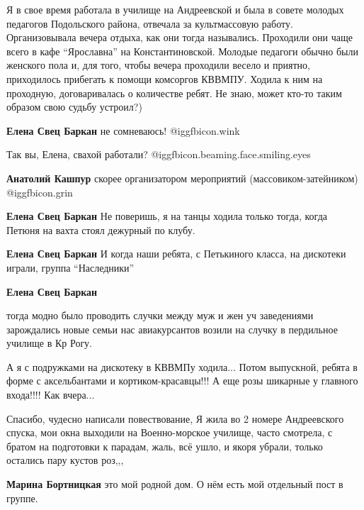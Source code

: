 \begin{itemize}
Я в свое время работала в училище на Андреевской и была в совете молодых
педагогов Подольского района, отвечала за культмассовую работу. Организовывала
вечера отдыха, как они тогда назывались. Проходили они чаще всего в кафе
\enquote{Ярославна} на Константиновской. Молодые педагоги обычно были женского пола и,
для того, чтобы вечера проходили весело и приятно, приходилось прибегать к
помощи комсоргов КВВМПУ. Ходила к ним на проходную, договаривалась о количестве
ребят. Не знаю, может кто-то таким образом свою судьбу устроил?)

\begin{itemize} %
\textbf{Елена Свец Баркан} не сомневаюсь! @igg{fbicon.wink} 

Так вы, Елена, свахой работали?  @igg{fbicon.beaming.face.smiling.eyes} 

\textbf{Анатолий Кашпур} скорее организатором мероприятий (массовиком-затейником) @igg{fbicon.grin} 

\textbf{Елена Свец Баркан} Не поверишь, я на танцы ходила только тогда, когда Петюня на вахта стоял дежурный по клубу.

\textbf{Елена Свец Баркан} И когда наши ребята, с Петькиного класса, на дискотеки играли, группа \enquote{Наследники}

\textbf{Елена Свец Баркан} 

тогда модно было проводить случки между муж и жен уч заведениями зарождались
новые семьи нас авиакурсантов возили на случку в пердильное училище в Кр Рогу.

\end{itemize} %


А я с подружками на дискотеку в КВВМПу ходила... Потом выпускной, ребята в
форме с аксельбантами и кортиком-красавцы!!! А еще розы шикарные у главного
входа!!!! Как вчера...



Спасибо, чудесно написали повествование, Я жила во 2 номере Андреевского
спуска, мои окна выходили на Военно-морское училище, часто смотрела, с братом на
подготовки к парадам, жаль, всё ушло, и якоря убрали, только остались пару кустов
роз,,,

\begin{itemize} %
\textbf{Марина Бортницкая} это мой родной дом. О нём есть мой отдельный пост в группе.


\end{itemize}
\end{itemize}
